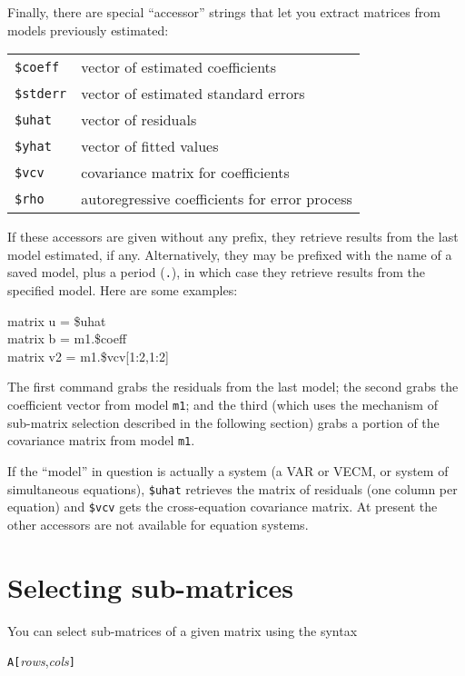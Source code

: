 Finally, there are special ``accessor'' strings that let you extract
matrices from models previously estimated:

\begin{center}
\begin{tabular}{ll}
\texttt{\$coeff} & vector of estimated coefficients \\
\texttt{\$stderr} & vector of estimated standard errors \\
\texttt{\$uhat} & vector of residuals \\
\texttt{\$yhat} & vector of fitted values \\
\texttt{\$vcv} & covariance matrix for coefficients \\
\texttt{\$rho} & autoregressive coefficients for error process
\end{tabular}
\end{center}

If these accessors are given without any prefix, they retrieve results
from the last model estimated, if any.  Alternatively, they may be
prefixed with the name of a saved model, plus a period (\texttt{.}), in
which case they retrieve results from the specified model.  Here are
some examples:
%
\begin{textcode}
matrix u = \$uhat\\
matrix b = m1.\$coeff\\
matrix v2 = m1.\$vcv[1:2,1:2]
\end{textcode}
%
The first command grabs the residuals from the last model; the second
grabs the coefficient vector from model \texttt{m1}; and the third
(which uses the mechanism of sub-matrix selection described in the
following section) grabs a portion of the covariance matrix from model
\texttt{m1}.

If the ``model'' in question is actually a system (a VAR
or VECM, or system of simultaneous equations), \texttt{\$uhat}
retrieves the matrix of residuals (one column per equation) and
\texttt{\$vcv} gets the cross-equation covariance matrix.  At present
the other accessors are not available for equation systems.


\section{Selecting sub-matrices}
\label{matrix-sub}

You can select sub-matrices of a given matrix using the syntax

\texttt{A[}\textsl{rows},\textsl{cols}\texttt{]}

